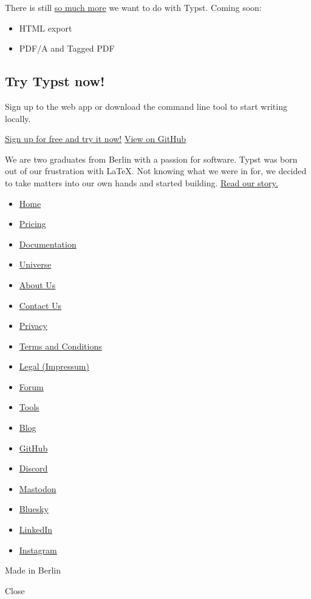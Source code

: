 There is still \href{/docs/roadmap}{so much more} we want to do with
Typst. Coming soon:

\begin{itemize}
\tightlist
\item
  HTML export
\item
  PDF/A and Tagged PDF
\end{itemize}

\label{cta}
\subsection{Try Typst now!}\label{try-typst-now}

Sign up to the web app or download the command line tool to start
writing locally.

\href{/signup}{Sign up for free and try it now!}
\href{https://github.com/typst/typst}{View on GitHub}

\label{mission}
We are two graduates from Berlin with a passion for software. Typst was
born out of our frustration with LaTeX. Not knowing what we were in for,
we decided to take matters into our own hands and started building.
\href{/about/}{Read our story.}

\begin{itemize}
\tightlist
\item
  \href{/\#start}{Home}
\item
  \href{/pricing/}{Pricing}
\item
  \href{/docs/}{Documentation}
\item
  \href{/universe/}{Universe}
\item
  \href{/about/}{About Us}
\item
  \href{/contact/}{Contact Us}
\item
  \href{/privacy/}{Privacy}
\item
  \href{https://typst.app/terms}{Terms and Conditions}
\item
  \href{/legal/}{Legal (Impressum)}
\end{itemize}

\begin{itemize}
\tightlist
\item
  \href{https://forum.typst.app}{Forum}
\item
  \href{/tools/}{Tools}
\item
  \href{/blog/}{Blog}
\item
  \href{https://github.com/typst/}{GitHub}
\item
  \href{https://discord.gg/2uDybryKPe}{Discord}
\item
  \href{https://mastodon.social/@typst}{Mastodon}
\item
  \href{https://bsky.app/profile/typst.app}{Bluesky}
\item
  \href{https://www.linkedin.com/company/typst/}{LinkedIn}
\item
  \href{https://instagram.com/typstapp/}{Instagram}
\end{itemize}

Made in Berlin

\label{modal}
\pandocbounded{}

\label{md-insert}
Close

\pandocbounded{}

